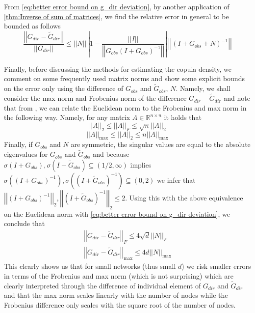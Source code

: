 \documentclass[../Thesis.tex]{subfiles}
\begin{document}
From \autoref{eq:better error bound on g_dir deviation}, by another application of \autoref{thm:Inverse of sum of matrices}, we find the relative error in general to be bounded as follows
$$\frac{\left|\left|G_{dir} - \tilde{G}_{dir}\right|\right|}{\left|\left|G_{dir}\right|\right|} \leq \left|\left| N \right|\right| \, \left|1 - \frac{\left|\left| I \right|\right|}{\left|\left| G_{obs} \left(I +G_{obs}\right)^{-1} \right|\right|} \right|\, \left|\left| \left(I + G_{obs} + N\right)^{-1} \right|\right|$$

Finally, before discussing the methods for estimating the copula density, we comment on some frequently used matrix norms and show some explicit bounds on the error only using the difference of $G_{obs}$ and $\tilde{G}_{obs}$, $N$. Namely, we shall consider the max norm and Frobenius norm of the difference $G_{dir} - \tilde{G}_{dir}$ and note that from \cite{GoluVanl96}, we can relate the Euclidean norm to the Frobenius and max norm in the following way. Namely, for any matrix $A\in \mathbb{R}^{n\times n}$ it holds that
$$\left|\left| A \right|\right|_2 \leq \left|\left| A \right|\right|_F \leq \sqrt{n} \left|\left| A \right|\right|_2$$
$$\left|\left| A \right|\right|_{\max} \leq \left|\left| A \right|\right|_2 \leq n \left|\left| A \right|\right|_{\max} $$
Finally, if $G_{obs}$ and $N$ are symmetric, the singular values are equal to the absolute eigenvalues for $G_{obs}$ and $\tilde{G}_{obs}$ and because $\sigma\left(I + G_{obs}\right), \sigma\left(I + \tilde{G}_{obs}\right) \subseteq (1/2, \infty)$ implies $\sigma\left(\left(I + G_{obs}\right)^{-1}\right), \sigma\left(\left( I +\tilde{ G}_{obs}\right)^{-1}\right) \subseteq (0,2)$ we infer that $\left|\left| \left(I + G_{obs}\right)^{-1} \right|\right|_2 , \left|\left| \left(I + \tilde{G}_{obs}\right)^{-1} \right|\right|_2\leq 2$. Using this with the above equivalence on the Euclidean norm with \autoref{eq:better error bound on g_dir deviation}, we conclude that
\begin{equation}\label{eq:G_dir difference frob and max bounds}
    \begin{split}
        \left|\left| G_{dir} - \tilde{G}_{dir} \right|\right|_F \leq 4 \sqrt{d} \left|\left| N \right|\right|_F\\
        \left|\left| G_{dir} - \tilde{G}_{dir} \right|\right|_{\max} \leq 4 d \left|\left| N \right|\right|_{\max}
    \end{split}
\end{equation}
This clearly shows us that for small networks (thus small $d$) we risk smaller errors in terms of the Frobenius and max norm (which is not surprising) which are clearly interpreted through the difference of individual element of $G_{dir}$ and $\tilde{G}_{dir}$ and that the max norm scales linearly with the number of nodes while the Frobenius difference only scales with the square root of the number of nodes.
\end{document}
